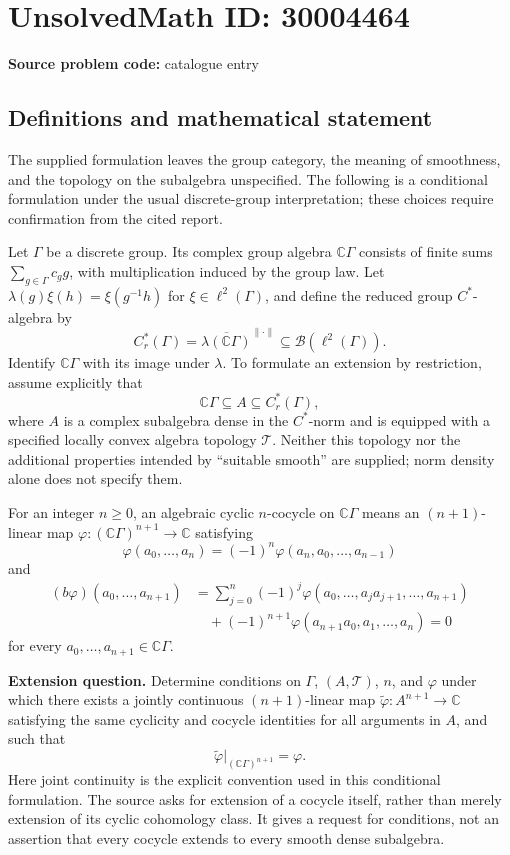 \documentclass[11pt]{article}
\newcommand{\C}{\mathbb{C}}
\begin{document}
\section*{UnsolvedMath ID: 30004464}
\textbf{Source problem code:} catalogue entry
\subsection{Definitions and mathematical statement}
The supplied formulation leaves the group category, the meaning of smoothness, and the topology on the subalgebra unspecified. The following is a conditional formulation under the usual discrete-group interpretation; these choices require confirmation from the cited report.

Let \(\Gamma\) be a discrete group. Its complex group algebra \(\C\Gamma\) consists of finite sums \(\sum_{g\in\Gamma}c_g g\), with multiplication induced by the group law. Let \(\lambda(g)\xi(h)=\xi(g^{-1}h)\) for \(\xi\in\ell^2(\Gamma)\), and define the reduced group \(C^*\)-algebra by
\[
C_r^*(\Gamma)=\overline{\lambda(\C\Gamma)}^{\|\cdot\|}\subseteq\mathcal B(\ell^2(\Gamma)).
\]
Identify \(\C\Gamma\) with its image under \(\lambda\). To formulate an extension by restriction, assume explicitly that
\[
\C\Gamma\subseteq A\subseteq C_r^*(\Gamma),
\]
where \(A\) is a complex subalgebra dense in the \(C^*\)-norm and is equipped with a specified locally convex algebra topology \(\mathcal T\). Neither this topology nor the additional properties intended by ``suitable smooth'' are supplied; norm density alone does not specify them.

For an integer \(n\geq0\), an algebraic cyclic \(n\)-cocycle on \(\C\Gamma\) means an \((n+1)\)-linear map \(\varphi:(\C\Gamma)^{n+1}\to\C\) satisfying
\[
\varphi(a_0,\ldots,a_n)=(-1)^n\varphi(a_n,a_0,\ldots,a_{n-1})
\]
and
\[
\begin{aligned}
(b\varphi)(a_0,\ldots,a_{n+1})
&=\sum_{j=0}^{n}(-1)^j\varphi(a_0,\ldots,a_ja_{j+1},\ldots,a_{n+1})\\
&\quad+(-1)^{n+1}\varphi(a_{n+1}a_0,a_1,\ldots,a_n)=0
\end{aligned}
\]
for every \(a_0,\ldots,a_{n+1}\in\C\Gamma\).

\textbf{Extension question.} Determine conditions on \(\Gamma\), \((A,\mathcal T)\), \(n\), and \(\varphi\) under which there exists a jointly continuous \((n+1)\)-linear map \(\widetilde\varphi:A^{n+1}\to\C\) satisfying the same cyclicity and cocycle identities for all arguments in \(A\), and such that
\[
\widetilde\varphi\big|_{(\C\Gamma)^{n+1}}=\varphi.
\]
Here joint continuity is the explicit convention used in this conditional formulation. The source asks for extension of a cocycle itself, rather than merely extension of its cyclic cohomology class. It gives a request for conditions, not an assertion that every cocycle extends to every smooth dense subalgebra.
\end{document}
